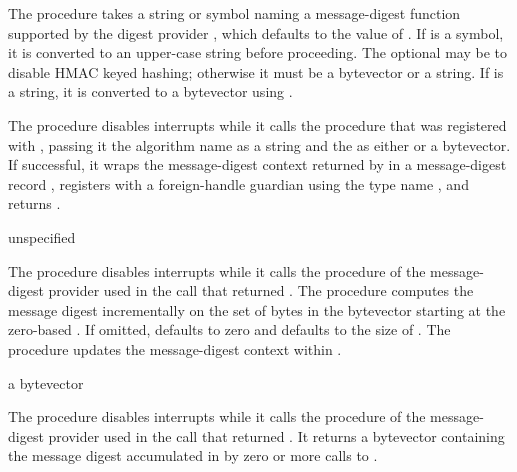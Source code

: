 The  procedure takes a string or symbol 
naming a message-digest function supported by the digest provider
, which defaults to the value of .
If  is a symbol, it is converted to an upper-case string
before proceeding.
The optional  may be  to disable HMAC keyed
hashing; otherwise it must be a bytevector or a string.
If  is a string, it is converted to a bytevector
using .

The  procedure disables interrupts while it calls the 
procedure that was registered with , passing it the
algorithm name as a string and the  as either  or a
bytevector.
If successful, it wraps the message-digest context returned by 
in a message-digest record , registers 
with a foreign-handle guardian using the type name ,
and returns .

\begin{procedure}
\end{procedure}
\returns{} unspecified

The  procedure disables interrupts while it calls the 
procedure of the message-digest provider used in the 
call that returned .
The  procedure computes the message digest incrementally
on the set of  bytes in the bytevector  starting at
the zero-based .
If omitted,  defaults to zero and  defaults
to the size of .
The  procedure updates the message-digest context within .

\begin{procedure}
\end{procedure}
\returns{} a bytevector

The  procedure disables interrupts while it calls the 
procedure of the message-digest provider used in the 
call that returned .
It returns a bytevector containing the message digest accumulated in 
by zero or more calls to .

